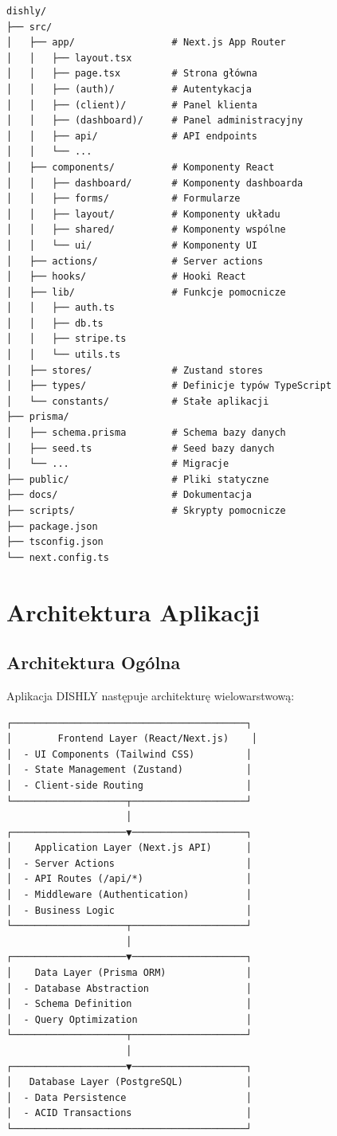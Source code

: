 \documentclass[12pt,a4paper,utf-8]{article}
\begin{document}
\begin{verbatim}
dishly/
├── src/
│   ├── app/                 # Next.js App Router
│   │   ├── layout.tsx
│   │   ├── page.tsx         # Strona główna
│   │   ├── (auth)/          # Autentykacja
│   │   ├── (client)/        # Panel klienta
│   │   ├── (dashboard)/     # Panel administracyjny
│   │   ├── api/             # API endpoints
│   │   └── ...
│   ├── components/          # Komponenty React
│   │   ├── dashboard/       # Komponenty dashboarda
│   │   ├── forms/           # Formularze
│   │   ├── layout/          # Komponenty układu
│   │   ├── shared/          # Komponenty wspólne
│   │   └── ui/              # Komponenty UI
│   ├── actions/             # Server actions
│   ├── hooks/               # Hooki React
│   ├── lib/                 # Funkcje pomocnicze
│   │   ├── auth.ts
│   │   ├── db.ts
│   │   ├── stripe.ts
│   │   └── utils.ts
│   ├── stores/              # Zustand stores
│   ├── types/               # Definicje typów TypeScript
│   └── constants/           # Stałe aplikacji
├── prisma/
│   ├── schema.prisma        # Schema bazy danych
│   ├── seed.ts              # Seed bazy danych
│   └── ...                  # Migracje
├── public/                  # Pliki statyczne
├── docs/                    # Dokumentacja
├── scripts/                 # Skrypty pomocnicze
├── package.json
├── tsconfig.json
└── next.config.ts
\end{verbatim}

\newpage

\section{Architektura Aplikacji}

\subsection{Architektura Ogólna}

Aplikacja DISHLY następuje architekturę wielowarstwową:

\begin{verbatim}
┌─────────────────────────────────────────┐
│        Frontend Layer (React/Next.js)    │
│  - UI Components (Tailwind CSS)         │
│  - State Management (Zustand)           │
│  - Client-side Routing                  │
└────────────────────┬────────────────────┘
                     │
┌────────────────────▼────────────────────┐
│    Application Layer (Next.js API)      │
│  - Server Actions                       │
│  - API Routes (/api/*)                  │
│  - Middleware (Authentication)          │
│  - Business Logic                       │
└────────────────────┬────────────────────┘
                     │
┌────────────────────▼────────────────────┐
│    Data Layer (Prisma ORM)              │
│  - Database Abstraction                 │
│  - Schema Definition                    │
│  - Query Optimization                   │
└────────────────────┬────────────────────┘
                     │
┌────────────────────▼────────────────────┐
│   Database Layer (PostgreSQL)           │
│  - Data Persistence                     │
│  - ACID Transactions                    │
└─────────────────────────────────────────┘
\end{verbatim}
\end{document}
